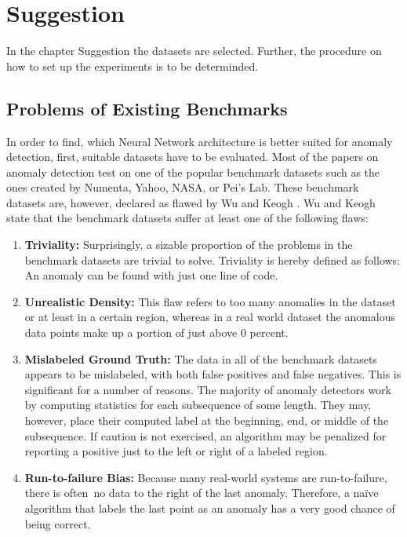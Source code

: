 \chapter{Suggestion}
In the chapter Suggestion the datasets are selected. Further, the procedure on how to set up the experiments is to be determinded.

\section{Problems of Existing Benchmarks} \label{Problems of Existing Benchmarks}
In order to find, which Neural Network architecture is better suited for anomaly detection, first, suitable datasets have to be evaluated. Most of the papers on anomaly detection test on one of the popular benchmark datasets such as the ones created by Numenta, Yahoo, NASA, or Pei's Lab. These benchmark datasets are, however, declared as flawed by Wu and Keogh \parencite{YEAR}. Wu and Keogh state that the benchmark datasets suffer at least one of the following flaws:

\begin{enumerate}
	\item \textbf{Triviality:} Surprisingly, a sizable proportion of the problems in the benchmark datasets are trivial to solve. Triviality is hereby defined as follows: An anomaly can be found with just one line of code.
	\item \textbf{Unrealistic Density:} This flaw refers to too many anomalies in the dataset or at least in a certain region, whereas in a real world dataset the anomalous data points make up a portion of just above 0 percent.   
	\item \textbf{Mislabeled Ground Truth:} The data in all of the benchmark datasets appears to be mislabeled, with both false positives and false negatives. This is significant for a number of reasons. The majority of anomaly detectors work by computing statistics for each subsequence of some length. They may, however, place their computed label at the beginning, end, or middle of the subsequence. If caution is not exercised, an algorithm may be penalized for reporting a positive just to the left or right of a labeled region.
	\item \textbf{Run-to-failure Bias:} Because many real-world systems are run-to-failure, there is often no data to the right of the last anomaly. Therefore, a naïve algorithm that labels the last point as an anomaly has a very good chance of being correct.
\end{enumerate}

